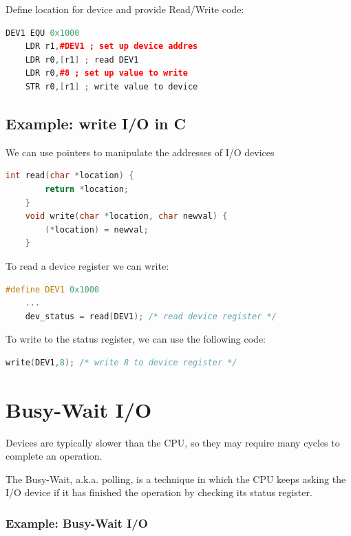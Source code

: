 Define location for device and provide Read/Write code:

\begin{lstlisting}[language=c++]
    DEV1 EQU 0x1000
    LDR r1,#DEV1 ; set up device addres
    LDR r0,[r1] ; read DEV1
    LDR r0,#8 ; set up value to write
    STR r0,[r1] ; write value to device
\end{lstlisting}


\subsection*{Example: write I/O in C}

We can use pointers to manipulate the addresses of I/O devices

\begin{lstlisting}[language=c]
    int read(char *location) {
        return *location;
    }
    void write(char *location, char newval) {
        (*location) = newval;
    }

\end{lstlisting}

To read a device register we can write:

\begin{lstlisting}[language=c]
    #define DEV1 0x1000
    ...
    dev_status = read(DEV1); /* read device register */
\end{lstlisting}

To write to the status register, we can use the following code:

\begin{lstlisting}[language=c]
    write(DEV1,8); /* write 8 to device register */
\end{lstlisting}


\section{Busy-Wait I/O}

Devices are typically slower than the CPU, so they may require many cycles to complete an operation.

The Busy-Wait, a.k.a. polling,  is a technique in which the CPU keeps asking the I/O
device if it has finished the operation by checking its status register.

\subsubsection{Example: Busy-Wait I/O}

